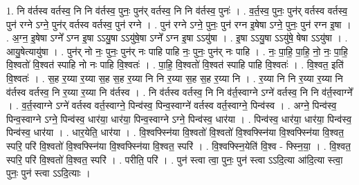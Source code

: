 \documentclass[17pt]{extarticle}
\begin{document}
1. नि व॑र्तस्व वर्तस्व॒ नि नि व॑र्तस्व॒ पुनः॒ पुन॑र् वर्तस्व॒ नि नि व॑र्तस्व॒ पुनः॑ । . व॒र्त॒स्व॒ पुनः॒ पुन॑र् वर्तस्व वर्तस्व॒ पुन॑ रग्ने ऽग्ने॒ पुन॑र् वर्तस्व वर्तस्व॒ पुन॑ रग्ने । . पुन॑ रग्ने ऽग्ने॒ पुनः॒ पुन॑ रग्न इ॒षेषा ऽग्ने॒ पुनः॒ पुन॑ रग्न इ॒षा । . अ॒ग्न॒ इ॒षेषा ऽग्ने᳚ ऽग्न इ॒षा ऽऽयु॒षा ऽऽयु॑षे॒षा ऽग्ने᳚ ऽग्न इ॒षा ऽऽयु॑षा । . इ॒षा ऽऽयु॒षा ऽऽयु॑षे॒ षेषा ऽऽयु॑षा । . आयु॒षेत्यायु॑षा । . पुन॑र् नो नः॒ पुनः॒ पुन॑र् नः पाहि पाहि नः॒ पुनः॒ पुन॑र् नः पाहि । . नः॒ पा॒हि॒ पा॒हि॒ नो॒ नः॒ पा॒हि॒ वि॒श्वतो॑ वि॒श्वत॑ स्पाहि नो नः पाहि वि॒श्वतः॑ । . पा॒हि॒ वि॒श्वतो॑ वि॒श्वत॑ स्पाहि पाहि वि॒श्वतः॑ । . वि॒श्वत॒ इति॑ वि॒श्वतः॑ । . स॒ह र॒य्या र॒य्या स॒ह स॒ह र॒य्या नि नि र॒य्या स॒ह स॒ह र॒य्या नि । . र॒य्या नि नि र॒य्या र॒य्या नि व॑र्तस्व वर्तस्व॒ नि र॒य्या र॒य्या नि व॑र्तस्व । . नि व॑र्तस्व वर्तस्व॒ नि नि व॑र्त॒स्वाग्ने ऽग्ने॑ वर्तस्व॒ नि नि व॑र्त॒स्वाग्ने᳚ । . व॒र्त॒स्वाग्ने ऽग्ने॑ वर्तस्व वर्त॒स्वाग्ने॒ पिन्व॑स्व॒ पिन्व॒स्वाग्ने॑ वर्तस्व वर्त॒स्वाग्ने॒ पिन्व॑स्व । . अग्ने॒ पिन्व॑स्व॒ पिन्व॒स्वाग्ने ऽग्ने॒ पिन्व॑स्व॒ धार॑या॒ धार॑या॒ पिन्व॒स्वाग्ने ऽग्ने॒ पिन्व॑स्व॒ धार॑या । . पिन्व॑स्व॒ धार॑या॒ धार॑या॒ पिन्व॑स्व॒ पिन्व॑स्व॒ धार॑या । . धार॒येति॒ धार॑या । . वि॒श्वफ्स्नि॑या वि॒श्वतो॑ वि॒श्वतो॑ वि॒श्वफ्स्नि॑या वि॒श्वफ्स्नि॑या वि॒श्वत॒ स्परि॒ परि॑ वि॒श्वतो॑ वि॒श्वफ्स्नि॑या वि॒श्वफ्स्नि॑या वि॒श्वत॒ स्परि॑ । . वि॒श्वफ्स्नि॒येति॑ वि॒श्व - फ्स्नि॒या॒ । . वि॒श्वत॒ स्परि॒ परि॑ वि॒श्वतो॑ वि॒श्वत॒ स्परि॑ । . परीति॒ परि॑ । . पुन॑ स्त्वा त्वा॒ पुनः॒ पुन॑ स्त्वा ऽऽदि॒त्या आ॑दि॒त्या स्त्वा॒ पुनः॒ पुन॑ स्त्वा ऽऽदि॒त्याः । \newline
\end{document}
